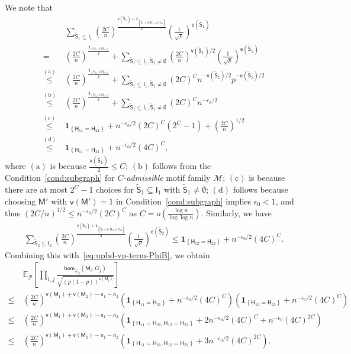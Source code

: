 \documentclass[letterpaper,11pt]{article}
\theoremstyle{definition}
\newcommand{\maM}{\mathcal{M}}
\newcommand{\maP}{\mathcal{P}}
\newcommand{\nbr}[1]{{\sf\color{red}[#1]}}
\newcommand{\en}{\mathsf{{e}}}
\newcommand{\vn}{\mathsf{{v}}}
\newcommand{\pth}[1]{\left( #1 \right)}
\newcommand{\qth}[1]{\left[ #1 \right]}
\newcommand{\ti}{\tilde}
\newcommand{\sfH}{{\mathsf{H}}}
\newcommand{\sfI}{{\mathsf{I}}}
\newcommand{\sfM}{{\mathsf{M}}}
\newcommand{\sfS}{{\mathsf{S}}}
\newcommand{\sfn}{{\mathsf{n}}}
\newcommand{\indc}[1]{{\mathbf{1}_{\left\{{#1}\right\}}}}
\renewcommand{\hom}{\mathsf{hom}}
\newcommand{\vp}{\varphi}
\def\E{\mathbb{E}}
\begin{document}
We note that \begin{align*}
    &~\sum_{\ti{\sfS}_1\subseteq \sfI_1} \pth{\frac{2C}{n}}^{\frac{\vn(\ti{\sfS}_1)+\indc{\ti{\sfS}_1 = \emptyset, \sfH_{11}\neq \sfH_{21}}}{2}} \pth{\frac{1}{\sqrt{p}}}^{\en(\ti{\sfS}_1)}\\ =&~ \pth{\frac{2C}{n}}^{\frac{\indc{\sfH_{11}\neq \sfH_{21}}}{2}}+\sum_{\ti{\sfS}_1\subseteq \sfI_1,\ti{\sfS}_1\neq \emptyset} \pth{\frac{2C}{n}}^{\vn(\ti{\sfS}_1)/2}\pth{\frac{1}{\sqrt{p}}}^{\en(\ti{\sfS}_1)}\\
    \overset{\mathrm{(a)}}{\le}&~\pth{\frac{2C}{n}}^{\frac{\indc{\sfH_{11}\neq \sfH_{21}}}{2}}+\sum_{\ti{\sfS}_1\subseteq \sfI_1,\ti{\sfS}_1\neq \emptyset} (2C)^C n^{-\vn(\ti{\sfS}_1)/2}p^{-\en(\ti{\sfS}_1)/2}\\
    \overset{\mathrm{(b)}}{\le}&~\pth{\frac{2C}{n}}^{\frac{\indc{\sfH_{11}\neq \sfH_{21}}}{2}}+\sum_{\ti{\sfS}_1\subseteq \sfI_1,\ti{\sfS}_1\neq \emptyset} (2C)^C n^{-\epsilon_0/2} \\\overset{\mathrm{(c)}}{\le}&~ \indc{\sfH_{11}=\sfH_{21}}+n^{-\epsilon_0/2}(2C)^C(2^C-1)+\pth{\frac{2C}{n}}^{1/2}\\\overset{\mathrm{(d)}}{\le}&~\indc{\sfH_{11}=\sfH_{21}}+n^{-\epsilon_0/2}(4C)^C,
\end{align*}
where $\mathrm{(a)}$ is because $\frac{\vn(\ti{\sfS}_1)}{2}\le C$; 
$\mathrm{(b)}$ follows from the Condition~\ref{cond:subgraph} for \emph{$C$-admissible} motif family $\maM$; $\mathrm{(c)}$ is because there are at most $2^C-1$ choices for $\ti{\sfS}_1\subseteq \sfI_1$ with $\ti{\sfS}_1\neq \emptyset$; $\mathrm{(d)}$ follows because choosing $\sfM'$ with $\vn(\sfM')=1$ in Condition~\ref{cond:subgraph} implies $\epsilon_0<1$, and thus $(2C/n)^{1/2}\le n^{-\epsilon_0/2}(2C)^C$ as $C = o\pth{\frac{\log n}{\log\log n}}$. 
Similarly, we have \begin{align*}
    \sum_{\ti{\sfS}_2\subseteq \sfI_2} \pth{\frac{2C}{n}}^{\frac{\vn(\ti{\sfS}_2)+\indc{\ti{\sfS}_2 = \emptyset, \sfH_{12}\neq \sfH_{22}}}{2}} \pth{\frac{1}{\sqrt{p}}}^{\en(\ti{\sfS}_2)}\le \indc{\sfH_{12} = \sfH_{22}}+n^{-\epsilon_0/2}(4C)^C.
\end{align*}
Combining this with~\eqref{eq:upbd-vp-term-PhiB}, we obtain \begin{align*}
    &~\E_{\maP}\qth{\prod_{i,j}\frac{\hom_{\vp_{ij}}(\sfM_i,\bar{G}_j)}{\sqrt{(p(1-p))^{\en(\sfM_i)}}}}
    \\\nonumber \le&~\pth{\frac{2C}{n}}^{\vn(\sfM_1)+\vn(\sfM_2)-\sfn_1-\sfn_2} \pth{\indc{\sfH_{11} = \sfH_{21}}+n^{-\epsilon_0/2}(4C)^C}\pth{\indc{\sfH_{12} = \sfH_{22}}+n^{-\epsilon_0/2}(4C)^C}\\
    \le&~\pth{\frac{2C}{n}}^{\vn(\sfM_1)+\vn(\sfM_2)-\sfn_1-\sfn_2}\pth{\indc{\sfH_{11}=\sfH_{21},\sfH_{12} = \sfH_{22}}+2n^{-\epsilon_0/2}\pth{4C}^C+n^{-\epsilon_0}\pth{4C}^{2C}}\\
    \le&~\pth{\frac{2C}{n}}^{\vn(\sfM_1)+\vn(\sfM_2)-\sfn_1-\sfn_2}\pth{\indc{\sfH_{11}=\sfH_{21},\sfH_{12} = \sfH_{22}}+3n^{-\epsilon_0/2}\pth{4C}^{2C}}.
\end{align*}
\end{document}
